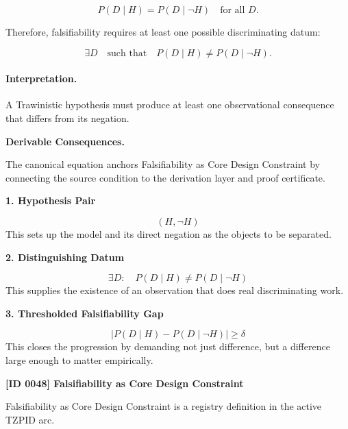 \begin{equation}
P(D\mid H)=P(D\mid \neg H)
\quad
\text{for all }D .
\end{equation}

Therefore, falsifiability requires at least one possible discriminating datum:

\begin{equation}
\boxed{
\exists D
\quad\text{such that}\quad
P(D\mid H)\neq P(D\mid \neg H).
}
\end{equation}

\paragraph{Interpretation.}
A Trawinistic hypothesis must produce at least one observational consequence that differs from its negation.

\par\vspace{0.35em}
\noindent\textbf{Derivable Consequences.}\quad
\begingroup
\footnotesize
\raggedright
The canonical equation anchors Falsifiability as Core Design Constraint by connecting the source condition to the derivation layer and proof certificate.
\par\endgroup

\noindent\textbf{1. Hypothesis Pair}\par
\[
(H, \neg H)
\]
\noindent This sets up the model and its direct negation as the objects to be separated.\par
\noindent\textbf{2. Distinguishing Datum}\par
\[
\exists D:
\quad
P(D\mid H) \neq P(D\mid \neg H)
\]
\noindent This supplies the existence of an observation that does real discriminating work.\par
\noindent\textbf{3. Thresholded Falsifiability Gap}\par
\[
\left|P(D\mid H) - P(D\mid \neg H)\right| \geq \delta
\]
\noindent This closes the progression by demanding not just difference, but a difference large enough to matter empirically.\par

\clearpage
\noindent\textbf{[ID 0048] Falsifiability as Core Design Constraint}\par
\vspace{0.35em}
\begingroup\small
{}
Falsifiability as Core Design Constraint is a registry definition in the active TZPID arc.

